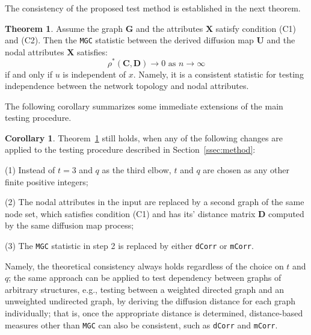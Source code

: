 \documentclass[11pt]{article}
\theoremstyle{definition}
\newtheorem{theorem}{Theorem}
\newtheorem{corollary}{Corollary}
\begin{document}
The consistency of the proposed test method is established in the next theorem.

\begin{theorem}
Assume the graph $\mathbf{G}$ and the attributes $\mathbf{X}$ satisfy condition (C1) and (C2). Then the \texttt{MGC} statistic between the derived diffusion map $\mathbf{U}$ and the nodal attributes $\mathbf{X}$ satisfies:
\begin{equation}
\rho^{*}(\mathbf{C}, \mathbf{D}) \longrightarrow 0 \mbox{ as } n \rightarrow \infty
\end{equation}
if and only if $u$ is independent of $x$. Namely, it is a consistent statistic for testing independence between the network topology and nodal attributes.
	\label{theoremMain}
\end{theorem} 

The following corollary summarizes some immediate extensions of the main testing procedure.

\begin{corollary}
\label{main_corollary}
Theorem~\ref{theoremMain} still holds, when any of the following changes are applied to the testing procedure described in Section~\ref{ssec:method}:
\begin{description}[align=left]
\item [] (1) Instead of $t=3$ and $q$ as the third elbow, $t$ and $q$ are chosen as any other finite positive integers;

\item [] (2) The nodal attributes in the input are replaced by a second graph of the same node set, which satisfies condition (C1) and has its' distance matrix $\mathbf{D}$ computed by the same diffusion map process;

\item [] (3) The \texttt{MGC} statistic in step 2 is replaced by either \texttt{dCorr} or \texttt{mCorr}.
\end{description}
\end{corollary}

Namely, the theoretical consistency always holds regardless of the choice on $t$ and $q$; the same approach can be applied to test dependency between graphs of arbitrary structures, e.g., testing between a weighted directed graph and an unweighted undirected graph, by deriving the diffusion distance for each graph individually; that is, once the appropriate distance is determined, distance-based measures other than \texttt{MGC} can also be consistent, such as \texttt{dCorr} and \texttt{mCorr}. 
\end{document}
